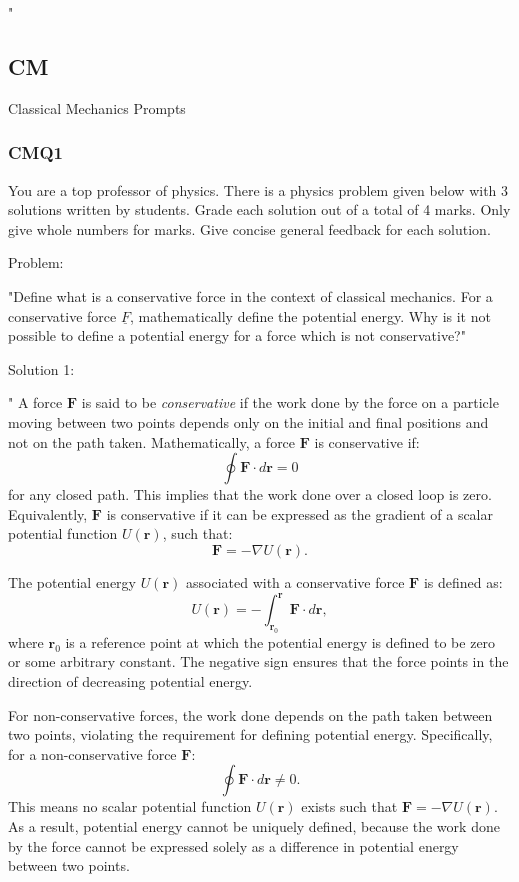 "


\subsection{CM}

Classical Mechanics Prompts

\subsubsection{CMQ1}

You are a top professor of physics. There is a physics problem given below with 3 solutions written by students. Grade each solution out of a total of 4 marks. Only give whole numbers for marks. Give concise general feedback for each solution.

Problem: 

"Define what is a conservative force in the context of classical mechanics. For a conservative force \( \underline{F} \), mathematically define the potential energy. Why is it not possible to define a potential energy for a force which is not conservative?"

Solution 1: 

"
A force $\mathbf{F}$ is said to be \textit{conservative} if the work done by the force on a particle moving between two points depends only on the initial and final positions and not on the path taken. Mathematically, a force $\mathbf{F}$ is conservative if:
\[
\oint \mathbf{F} \cdot d\mathbf{r} = 0
\]
for any closed path. This implies that the work done over a closed loop is zero. Equivalently, $\mathbf{F}$ is conservative if it can be expressed as the gradient of a scalar potential function $U(\mathbf{r})$, such that:
\[
\mathbf{F} = -\nabla U(\mathbf{r}).
\]

The potential energy $U(\mathbf{r})$ associated with a conservative force $\mathbf{F}$ is defined as:
\[
U(\mathbf{r}) = - \int_{\mathbf{r}_0}^{\mathbf{r}} \mathbf{F} \cdot d\mathbf{r},
\]
where $\mathbf{r}_0$ is a reference point at which the potential energy is defined to be zero or some arbitrary constant. The negative sign ensures that the force points in the direction of decreasing potential energy.

For non-conservative forces, the work done depends on the path taken between two points, violating the requirement for defining potential energy. Specifically, for a non-conservative force $\mathbf{F}$:
\[
\oint \mathbf{F} \cdot d\mathbf{r} \neq 0.
\]
This means no scalar potential function $U(\mathbf{r})$ exists such that $\mathbf{F} = -\nabla U(\mathbf{r})$. As a result, potential energy cannot be uniquely defined, because the work done by the force cannot be expressed solely as a difference in potential energy between two points.

